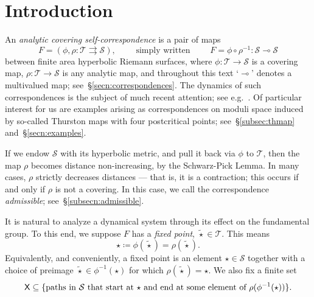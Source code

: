 \documentclass{amsart}
\theoremstyle{definition}
\theoremstyle{remark}
\newcommand{\sfX}{{\sf X}}
\newcommand{\cT}{\mathcal{T}}
\newcommand{\cS}{\mathcal{S}}
\begin{document}
%
%

\section{Introduction}\label{secn:intro}
An \emph{analytic covering self-correspondence} is a pair of maps
\[ F=(\phi, \rho \colon \cT\rightrightarrows\cS),\qquad\text{ simply written }\qquad F=\phi\circ \rho^{-1}\colon \cS \multimap \cS\]
between finite area hyperbolic Riemann surfaces, where $\phi\colon \cT\to\cS$ is a covering map, $\rho\colon  \cT\to\cS$ is any analytic map, and throughout this text `$\multimap$' denotes a multivalued map; see~\S\ref{secn:correspondences}.  The dynamics of such correspondences is the subject of much recent attention; see e.g.~\cites{MR1370680, MR4505392, MR1168195, MR4071411, MR4543152, MR4104599}. Of particular interest for us are examples arising as correspondences on moduli space induced by so-called Thurston maps with four postcritical points; see~\S\ref{subsec:thmap} and~\S\ref{secn:examples}.

If we endow $\cS$ with its hyperbolic metric, and pull it back via $\phi$ to $\cT$, then the map $\rho$ becomes distance non-increasing, by the Schwarz-Pick Lemma.  In many cases, $\rho$ strictly decreases distances --- that is, it is a contraction; this occurs if and only if $\rho$ is not a covering.  In this case, we call the correspondence \emph{admissible}; see~\S\ref{subsecn:admissible}.

It is natural to analyze a dynamical system through its effect on the fundamental group.  To this end, we suppose $F$ has a \emph{fixed point}, $\tilde{\star} \in \cT$.  This means 
\[ \star\coloneqq\phi (\tilde{\star})=\rho(\tilde{\star}).\]
Equivalently, and conveniently, a fixed point is an element $\star \in \cS$ together with a choice of preimage $\tilde{\star}\in \phi^{-1}(\star)$ for which $\rho(\tilde{\star})=\star$. We also fix a finite set
\begin{equation}\label{eq:genset}
  \sfX\subseteq\{\text{paths in $\cS$ that start at $\star$ and end at some element of $\rho(\phi^{-1}(\star))$}\}.
\end{equation}
\end{document}
